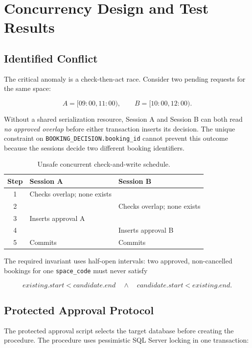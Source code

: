 \section{Concurrency Design and Test Results}

\subsection{Identified Conflict}

The critical anomaly is a check-then-act race. Consider two pending requests for the same space:

\[
  A=[09{:}00,11{:}00), \qquad B=[10{:}00,12{:}00).
\]

Without a shared serialization resource, Session A and Session B can both read \emph{no approved overlap} before either transaction inserts its decision. The unique constraint on \texttt{BOOKING\_DECISION.booking\_id} cannot prevent this outcome because the sessions decide two different booking identifiers.

\begin{table}[H]
  \centering
  \small
  \begin{tabularx}{\textwidth}{cXX}
    \toprule
    \textbf{Step} & \textbf{Session A} & \textbf{Session B}\\
    \midrule
    1 & Checks overlap; none exists & \\
    2 & & Checks overlap; none exists\\
    3 & Inserts approval A & \\
    4 & & Inserts approval B\\
    5 & Commits & Commits\\
    \bottomrule
  \end{tabularx}
  \caption{Unsafe concurrent check-and-write schedule.}
\end{table}

The required invariant uses half-open intervals: two approved, non-cancelled bookings for one \texttt{space\_code} must never satisfy

\[
  existing.start < candidate.end
  \quad\land\quad
  candidate.start < existing.end.
\]

\subsection{Protected Approval Protocol}

The protected approval script selects the target database before creating the procedure. The procedure uses pessimistic SQL Server locking in one transaction:

